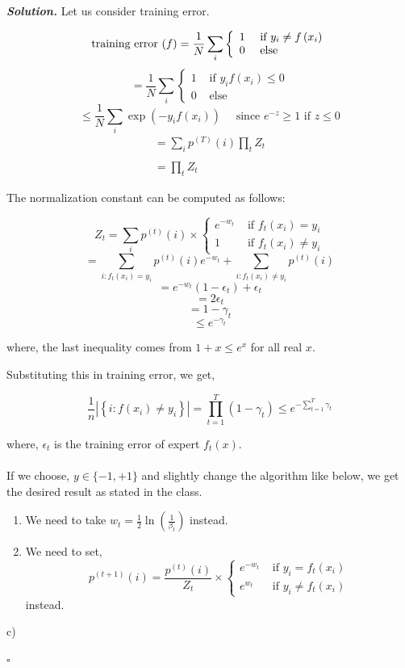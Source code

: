 \documentclass[12pt]{article}
\newenvironment{solution}[1][\it{Solution}]{\textbf{#1. } }{$\square$}
\begin{document}
\begin{solution}
Let us consider training error.

$$
\text { training error }(f)=\frac{1}{N} \sum_{i}\left\{\begin{array}{ll}
1 & \text { if } y_{i} \neq f\left(x_{i}\right) \\
0 & \text { else }
\end{array}\right.\\
$$
$$
=\frac{1}{N} \sum_{i}\left\{\begin{array}{ll}
1 & \text { if } y_{i} f\left(x_{i}\right) \leq 0 \\
0 & \text { else }
\end{array}\right.
$$
$$
\leq \frac{1}{N} \sum_{i} \exp \left(-y_{i} f\left(x_{i}\right)\right) \quad \text { since } e^{-z} \geq 1 \text { if } z \leq 0
$$
$$
\begin{array}{l}
=\sum_{i} p^{(T)}(i) \prod_{t} Z_{t} \\\\
=\prod_{t} Z_{t}
\end{array}
$$

The normalization constant can be computed as follows:

$$
Z_{t}=\sum_{i} p^{(t)}(i) \times\left\{\begin{array}{ll}
e^{-w_{t}} & \text { if } f_{t}\left(x_{i}\right)=y_{i} \\
1 & \text { if } f_{t}\left(x_{i}\right) \neq y_{i}
\end{array}\right.
$$
$$
=\sum_{i: f_{t}\left(x_{i}\right)=y_{i}} p^{(t)}(i) e^{-w_{t}} + \sum_{i: f_{t}\left(x_{i}\right)\ne y_{i}} p^{(t)}(i)
$$
$$
=e^{-w_{t}}(1-\epsilon_t)+\epsilon_t
$$
$$
=2\epsilon_t
$$
$$
=1-\gamma_t
$$
$$
\le e^{-\gamma_t}
$$

where, the last inequality comes from $1 + x \le e^{x}$ for all real $x$.


Substituting this in training error, we get,

$$
\frac{1}{n}\left|\left\{i: f\left(x_{i}\right) \neq y_{i}\right\}\right| = \prod_{t=1}^{T} (1-\gamma_{t}) \leq e^{-\sum_{t=1}^{T} \gamma_{t}}
$$

where, $\epsilon_{t}$ is the training error of expert $f_t(x)$.\\\\

If we choose, $y \in \{-1, +1\}$ and slightly change the algorithm like below, we get the desired result as stated in the class. 
\begin{enumerate}
\item We need to take $w_t = \frac{1}{2}\ln(\frac{1}{\beta_t})$ instead.
\item We need to set,
$$
p^{(t+1)}(i)=\frac{p^{(t)}(i)}{Z_{t}} \times\left\{\begin{array}{ll}
e^{-w_{t}} & \text { if } y_{i}=f_{t}\left(x_{i}\right) \\
e^{w_{t}} & \text { if } y_{i} \neq f_{t}\left(x_{i}\right)
\end{array}\right.
$$ instead.
\end{enumerate}
c)


\end{solution}
\end{document}
